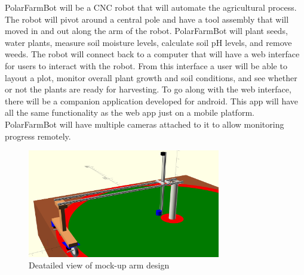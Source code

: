 PolarFarmBot will be a CNC robot that will automate the agricultural process. The robot will pivot around a central pole and have a tool assembly that will moved in and out along the arm of the robot.
PolarFarmBot will plant seeds, water plants, measure soil moisture levels, calculate soil pH levels, and remove weeds.
The robot will connect back to a computer that will have a web interface for users to interact with the robot. From this interface a user will be able to layout a plot, monitor overall plant growth and soil conditions, and see whether or not the plants are ready for harvesting.
To go along with the web interface, there will be a companion application developed for android. This app will have all the same functionality as the web app just on a mobile platform.
PolarFarmBot will have multiple cameras attached to it to allow monitoring progress remotely.


\begin{figure}[h!]
    \centering
    \includegraphics[width=0.75\textwidth]{images/arm-closeup}
    \caption{Deatailed view of mock-up arm design}
\end{figure}